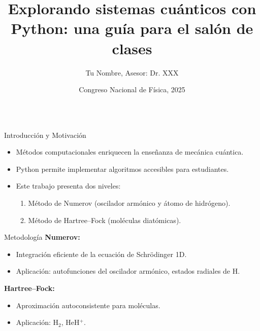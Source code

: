 \documentclass[final]{beamer}
\title{Explorando sistemas cuánticos con Python: una guía para el salón de clases}
\author{Tu Nombre, Asesor: Dr. XXX}
\institute{Universidad de Sonora}
\date{Congreso Nacional de Física, 2025}
\begin{document}
\begin{frame}[t]

\begin{columns}[t,totalwidth=\textwidth]

\begin{column}{0.32\textwidth}
  \begin{block}{Introducción y Motivación}
    \begin{itemize}
      \item Métodos computacionales enriquecen la enseñanza de mecánica cuántica.
      \item Python permite implementar algoritmos accesibles para estudiantes.
      \item Este trabajo presenta dos niveles:
      \begin{enumerate}
        \item Método de Numerov (oscilador armónico y átomo de hidrógeno).
        \item Método de Hartree–Fock (moléculas diatómicas).
      \end{enumerate}
    \end{itemize}
  \end{block}

  \begin{block}{Metodología}
    \textbf{Numerov:}
    \begin{itemize}
      \item Integración eficiente de la ecuación de Schrödinger 1D.
      \item Aplicación: autofunciones del oscilador armónico, estados radiales de H.
    \end{itemize}
    \vspace{1em}
    \textbf{Hartree–Fock:}
    \begin{itemize}
      \item Aproximación autoconsistente para moléculas.
      \item Aplicación: H$_2$, HeH$^+$.
    \end{itemize}
  \end{block}
\end{column}


\end{columns}
\end{frame}
\end{document}
